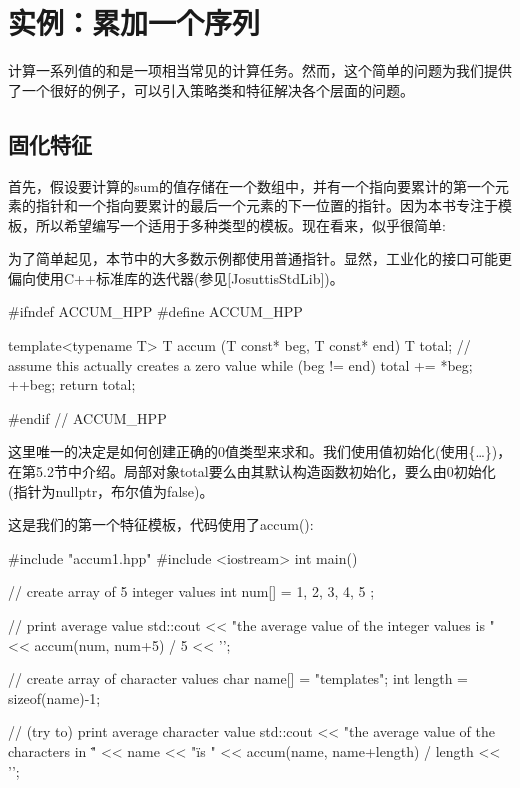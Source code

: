 \section{实例：累加一个序列}

计算一系列值的和是一项相当常见的计算任务。然而，这个简单的问题为我们提供了一个很好的例子，可以引入策略类和特征解决各个层面的问题。

\subsection{固化特征}

首先，假设要计算的sum的值存储在一个数组中，并有一个指向要累计的第一个元素的指针和一个指向要累计的最后一个元素的下一位置的指针。因为本书专注于模板，所以希望编写一个适用于多种类型的模板。现在看来，似乎很简单:

\begin{notice}
为了简单起见，本节中的大多数示例都使用普通指针。显然，工业化的接口可能更偏向使用C++标准库的迭代器(参见[JosuttisStdLib])。
\end{notice}

\begin{cpp}
#ifndef ACCUM_HPP
#define ACCUM_HPP

template<typename T>
T accum (T const* beg, T const* end)
{
	T total{}; // assume this actually creates a zero value
	while (beg != end) {
		total += *beg;
		++beg;
	}
	return total;
}

#endif // ACCUM_HPP
\end{cpp}

这里唯一的决定是如何创建正确的0值类型来求和。我们使用值初始化(使用\{…\})，在第5.2节中介绍。局部对象total要么由其默认构造函数初始化，要么由0初始化(指针为nullptr，布尔值为false)。

这是我们的第一个特征模板，代码使用了accum():

\begin{cpp}
#include "accum1.hpp"
#include <iostream>
int main()
{
	// create array of 5 integer values
	int num[] = { 1, 2, 3, 4, 5 };
	
	// print average value
	std::cout << "the average value of the integer values is "
			  << accum(num, num+5) / 5
			  << ’\n’;
			  
	// create array of character values
	char name[] = "templates";
	int length = sizeof(name)-1;
	
	// (try to) print average character value
	std::cout << "the average value of the characters in \""
			  << name << "\" is "
			  << accum(name, name+length) / length
			  << ’\n’;
}
\end{cpp}

